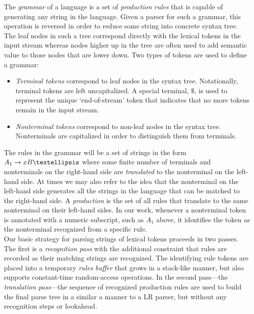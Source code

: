 \documentclass[a4paper,11pt]{article}
\begin{document}
The \emph{grammar} of a language is a set of \emph{production rules} that is capable of generating any string in the language. 
Given a parser for such a grammar, this operation is reversed in order to reduce some string into concrete syntax tree. 
The leaf nodes in such a tree correspond directly with the lexical tokens in the input stream whereas nodes higher up in the tree are often used to add semantic value to those nodes that are lower down.
Two types of tokens are used to define a grammar:
\begin{itemize}
\item \emph{Terminal tokens} correspond to leaf nodes in the syntax tree. Notationally, terminal tokens are left uncapitalized. A special terminal, $\$$, is used to represent the unique `end-of-stream' token that indicates that no more tokens remain in the input stream.
\item \emph{Nonterminal tokens} correspond to non-leaf nodes in the syntax tree. Nonterminals are capitalized in order to distinguish them from terminals.
\end{itemize}
The rules in the grammar will be a set of strings in the form $A_1 \rightarrow x B \textellipsis$ where some finite number of terminals and nonterminals on the right-hand side are \emph{translated} to the nonterminal on the left-hand side.
At times we may also refer to the idea that the nonterminal on the left-hand side generates all the strings in the language that can be matched to the right-hand side.
A \emph{production} is the set of all rules that translate to the same nonterminal on their left-hand sides.
In our work, whenever a nonterminal token is annotated with a numeric subscript, such as $A_1$ above, it identifies the token as the nonterminal recognized from a specific rule.\\

Our basic strategy for parsing strings of lexical tokens proceeds in two passes.
The first is a \emph{recognition pass} with the additional constraint that rules are recorded as their matching strings are recognized.
The identifying rule tokens are placed into a temporary \emph{rules buffer} that grows in a stack-like manner, but also supports constant-time random-access operations.
In the second pass---the \emph{translation pass}---the sequence of recognized production rules are used to build the final parse tree in a similar a manner to a LR parser, but without any recognition steps or lookahead.
\end{document}
